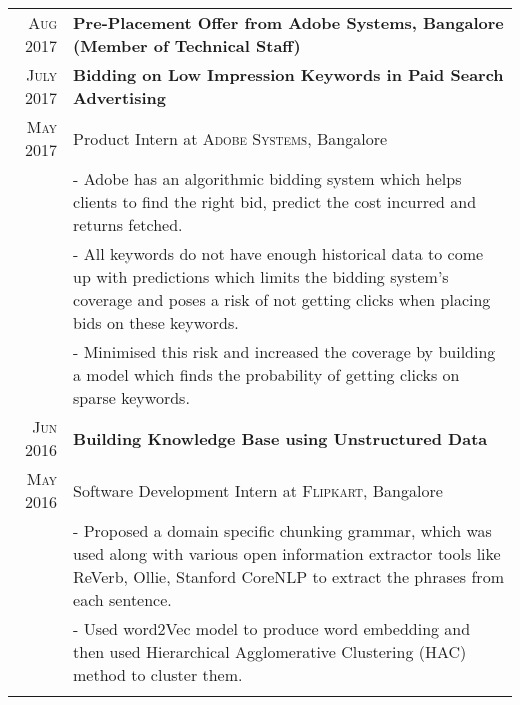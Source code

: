 \documentclass[a4paper,10pt]{extarticle} %
\begin{document}
\begin{tabular}{r|p{16cm}}
\vspace*{5pt}
\textsc{\normalsize{Aug 2017}} & \textbf{\normalsize{Pre-Placement Offer from Adobe Systems, Bangalore (Member of Technical Staff)}}\\
\textsc{\normalsize{July 2017}} & \textbf{\normalsize{Bidding on Low Impression Keywords in Paid Search Advertising}}\\
\textsc{\normalsize{May 2017}} & \small{Product Intern at} \textsc{Adobe Systems}\small{, Bangalore}\\
& \footnotesize{- Adobe has an algorithmic bidding system which helps clients to find the right bid, predict the cost incurred and returns fetched.}\\
& \footnotesize{- All keywords do not have enough historical data to come up with predictions which limits the bidding system's coverage and poses a risk of not getting clicks when placing bids on these keywords.}\\
& \footnotesize{- Minimised this risk and increased the coverage by building a model which finds the probability of getting clicks on sparse keywords.}
\multicolumn{2}{c}{}\\

\textsc{\normalsize{Jun 2016}} & \textbf{\normalsize{Building Knowledge Base using Unstructured Data}}\\
\textsc{\normalsize{May 2016}} & \small{Software Development Intern at} \textsc{Flipkart}\small{, Bangalore}\\
& \footnotesize{- Proposed a domain specific chunking grammar, which was used along with various open information extractor tools like ReVerb, Ollie, Stanford CoreNLP to extract the phrases from each sentence.}\\
& \footnotesize{- Used word2Vec model to produce word embedding and then used Hierarchical Agglomerative Clustering (HAC) method to cluster them.}\\
\multicolumn{2}{c}{} \\

\end{tabular}

\end{document}
